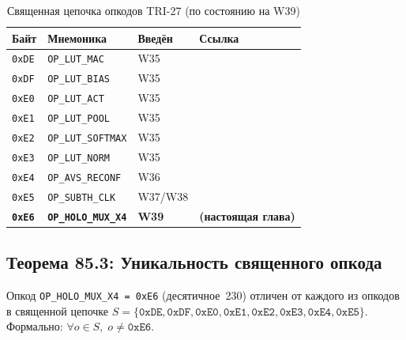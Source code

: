 \begin{table}[ht]
\centering
\caption{Священная цепочка опкодов TRI-27 (по состоянию на W39)}
\label{tab:sacred-chain}
\begin{tabular}{@{}llll@{}}
\toprule
Байт & Мнемоника & Введён & Ссылка \\
\midrule
\texttt{0xDE} & \texttt{OP\_LUT\_MAC}        & W35 & \cite{trios882} \\
\texttt{0xDF} & \texttt{OP\_LUT\_BIAS}        & W35 & \cite{trios874} \\
\texttt{0xE0} & \texttt{OP\_LUT\_ACT}         & W35 & \cite{trios874} \\
\texttt{0xE1} & \texttt{OP\_LUT\_POOL}        & W35 & \cite{trios874} \\
\texttt{0xE2} & \texttt{OP\_LUT\_SOFTMAX}     & W35 & \cite{trios874} \\
\texttt{0xE3} & \texttt{OP\_LUT\_NORM}        & W35 & \cite{trios874} \\
\texttt{0xE4} & \texttt{OP\_AVS\_RECONF}      & W36 & \cite{t27661} \\
\texttt{0xE5} & \texttt{OP\_SUBTH\_CLK}       & W37/W38 & \cite{t27660,trios871} \\
\textbf{\texttt{0xE6}} & \textbf{\texttt{OP\_HOLO\_MUX\_X4}} &
  \textbf{W39} & \textbf{(настоящая глава)} \\
\bottomrule
\end{tabular}
\end{table}

\subsection{Теорема 85.3: Уникальность священного опкода}
\label{subsec:glava85-thm3}

\begin{theorem}
\label{thm:holo-mux-op-uniqueness}
Опкод \texttt{OP\_HOLO\_MUX\_X4 = 0xE6} (десятичное~230) отличен
от каждого из опкодов в священной цепочке
$S = \{\texttt{0xDE},\texttt{0xDF},\texttt{0xE0},\texttt{0xE1},
       \texttt{0xE2},\texttt{0xE3},\texttt{0xE4},\texttt{0xE5}\}$.
Формально: $\forall o \in S,\; o \neq \texttt{0xE6}$.
\end{theorem}

